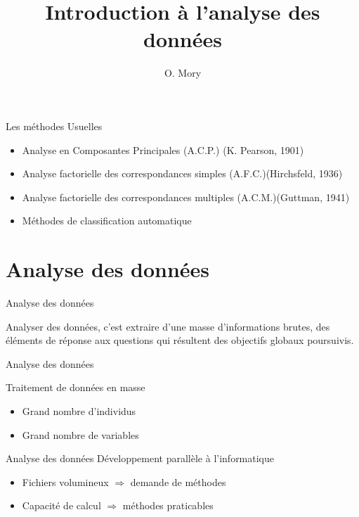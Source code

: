 \documentclass[11pt]{beamer}
\author{ O. Mory }
\title{Introduction à l'analyse des données}
\institute{LMI-SFA-UNA}
\begin{document}
\begin{frame}
\titlepage
\end{frame}


\begin{frame}{Les méthodes Usuelles}

\begin{itemize}
\item Analyse en Composantes Principales (A.C.P.) (K. Pearson, 1901)
\item Analyse factorielle des correspondances simples (A.F.C.)(Hirchsfeld, 1936)
\item Analyse factorielle des correspondances multiples (A.C.M.)(Guttman, 1941)
\item Méthodes de classification automatique
\end{itemize}

\end{frame}
\section{Analyse des données}
\begin{frame}{Analyse des données}

Analyser des données, c’est extraire d’une masse
d’informations brutes, des éléments de réponse aux
questions qui résultent des objectifs globaux
poursuivis.

\end{frame}

\begin{frame}{Analyse des données}

Traitement de données en masse 
\begin{itemize}
\item Grand nombre d’individus
\item Grand nombre de variables
\end{itemize}

\end{frame}

\begin{frame}{Analyse des données}
Développement parallèle à l’informatique

\begin{itemize}
\item Fichiers volumineux $\Rightarrow$ demande de méthodes
\item Capacité de calcul $\Rightarrow$ méthodes praticables
\end{itemize}
\end{frame}
\end{document}
